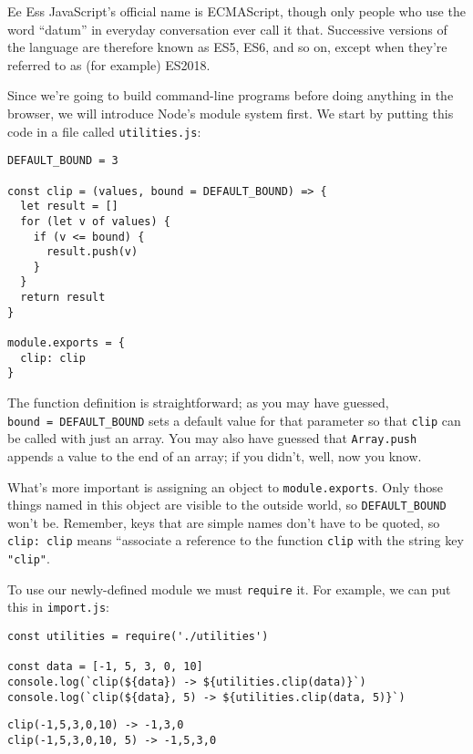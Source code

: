 \begin{aside}{Ee Ess}
  JavaScript's official name is ECMAScript,
  though only people who use the word ``datum'' in everyday conversation ever call it that.
  Successive versions of the language are therefore known as ES5, ES6, and so on,
  except when they're referred to as (for example) ES2018.
\end{aside}

Since we're going to build command-line programs before doing anything in the browser,
we will introduce Node's module system first.
We start by putting this code in a file called \texttt{utilities.js}:

\begin{verbatim}
DEFAULT_BOUND = 3

const clip = (values, bound = DEFAULT_BOUND) => {
  let result = []
  for (let v of values) {
    if (v <= bound) {
      result.push(v)
    }
  }
  return result
}

module.exports = {
  clip: clip
}
\end{verbatim}

The function definition is straightforward;
as you may have guessed, \texttt{bound\ =\ DEFAULT\_BOUND} sets a default value for that parameter
so that \texttt{clip} can be called with just an array.
You may also have guessed that \texttt{Array.push} appends a value to the end of an array;
if you didn't,
well,
now you know.

What's more important is assigning an object to \texttt{module.exports}.
Only those things named in this object are visible to the outside world,
so \texttt{DEFAULT\_BOUND} won't be.
Remember,
keys that are simple names don't have to be quoted,
so \texttt{clip:\ clip} means ``associate a reference to the function \texttt{clip} with the string key \texttt{"clip"}.

To use our newly-defined module we must \texttt{require} it.
For example,
we can put this in \texttt{import.js}:

\begin{verbatim}
const utilities = require('./utilities')

const data = [-1, 5, 3, 0, 10]
console.log(`clip(${data}) -> ${utilities.clip(data)}`)
console.log(`clip(${data}, 5) -> ${utilities.clip(data, 5)}`)
\end{verbatim}

\begin{verbatim}
clip(-1,5,3,0,10) -> -1,3,0
clip(-1,5,3,0,10, 5) -> -1,5,3,0
\end{verbatim}

